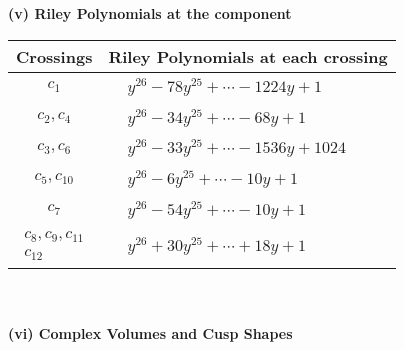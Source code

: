 \documentclass[1p]{elsarticle_modified}
\theoremstyle{definition}
\begin{document}
\newpage\renewcommand{\arraystretch}{1}
\flushleft \textbf{(v) Riley Polynomials at the component}\newline \\
\begin{tabular}{m{50pt}|m{274pt}}
Crossings & \hspace{64pt}Riley Polynomials at each crossing \\
\hline $$\begin{aligned}c_{1}\end{aligned}$$&$\begin{aligned}
&y^{26}-78 y^{25}+\cdots-1224 y+1
\end{aligned}$\\
\hline $$\begin{aligned}c_{2},c_{4}\end{aligned}$$&$\begin{aligned}
&y^{26}-34 y^{25}+\cdots-68 y+1
\end{aligned}$\\
\hline $$\begin{aligned}c_{3},c_{6}\end{aligned}$$&$\begin{aligned}
&y^{26}-33 y^{25}+\cdots-1536 y+1024
\end{aligned}$\\
\hline $$\begin{aligned}c_{5},c_{10}\end{aligned}$$&$\begin{aligned}
&y^{26}-6 y^{25}+\cdots-10 y+1
\end{aligned}$\\
\hline $$\begin{aligned}c_{7}\end{aligned}$$&$\begin{aligned}
&y^{26}-54 y^{25}+\cdots-10 y+1
\end{aligned}$\\
\hline $$\begin{aligned}c_{8},c_{9},c_{11}\\c_{12}\end{aligned}$$&$\begin{aligned}
&y^{26}+30 y^{25}+\cdots+18 y+1
\end{aligned}$\\
\hline
\end{tabular}\\~\\
\newpage\flushleft \textbf{(vi) Complex Volumes and Cusp Shapes}
\end{document}
